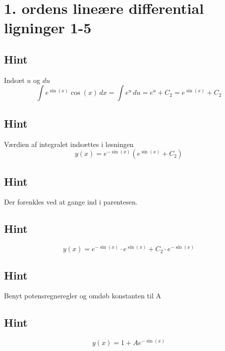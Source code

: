\documentclass{article}
\newenvironment{exercise}[1]{\newpage\section{#1}}{}
\newcommand{\hint}{\subsection*{Hint}}
\begin{document}
\begin{exercise}{1. ordens lineære differential ligninger 1-5}
	\hint 
	Indsæt $u$ og $du$
	\[
	\int e^{\sin(x)} \cos(x) \, dx = \int e^{u} \, du = e^{u} + C_2 = e^{\sin(x)} + C_2
	\]
	
	\hint
	
	Værdien af integralet indsættes i løsningen
	\[
	y(x) = e^{- \sin(x)} \left( e^{\sin(x)}+ C_2\right)
	\]
	
	\hint
	
	Der forenkles ved at gange ind i parentesen.
	
	\hint
	\[
	y(x) = e^{- \sin(x)} \cdot e^{\sin(x)} + C_2 \cdot e^{- \sin(x)} 
	\]
	
	\hint
	
	Benyt potensregneregler og omdøb konstanten til A
	
	\hint
	\[
	y(x) = 1 + A e^{-\sin(x)}
	\]
	
	
\end{exercise}

\newpage
\end{document}
